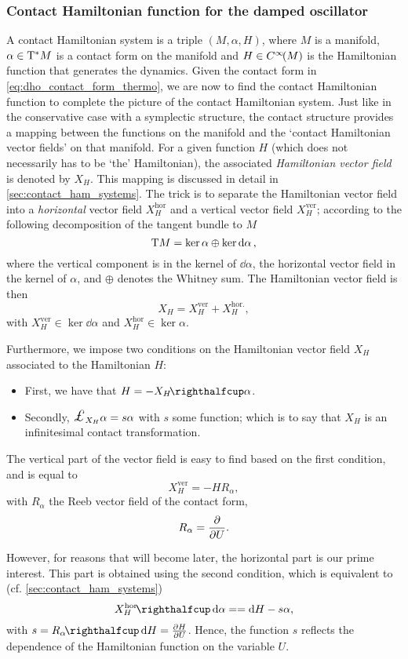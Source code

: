 \subsubsection{Contact Hamiltonian function for the damped oscillator}
A contact Hamiltonian system is a triple $(M, \alpha, H)$, where $M$ is a manifold, $\alpha \in \mathrm{T}^*M$ is a contact form on the manifold and $H \in C^\infty\!\qty(M)$ is the Hamiltonian function that generates the dynamics. Given the contact form in \cref{eq:dho_contact_form_thermo}, we are now to find the contact Hamiltonian function to complete the picture of the contact Hamiltonian system.  Just like in the conservative case with a symplectic structure, the contact structure provides a mapping between the functions on the manifold and the `contact Hamiltonian vector fields' on that manifold. For a given function $H$ (which does not necessarily has to be `the' Hamiltonian), the associated \emph{Hamiltonian vector field} is denoted by $X_H$. This mapping is discussed in detail in \cref{sec:contact_ham_systems}. The trick is to separate the Hamiltonian vector field into a \emph{horizontal} vector field $X^\text{hor}_H$  and a vertical vector field $X^\text{ver}_H$; according to the following decomposition of the tangent bundle to $M$ \cite{Libermann1987}
$$ \mathrm{T}M = \ker \alpha \oplus \ker \dd{\alpha},$$
where the vertical component is in the kernel of $ \dd{\alpha}$, the horizontal vector field in the kernel of $\alpha$, and $\oplus$ denotes the Whitney sum. The Hamiltonian vector field is then 
$$ X_H = X_H^\text{ver} + X_H^\text{hor.}, $$
with $X_H^\text{ver} \in \ker \dd{\alpha}$ and $X_H^\text{hor} \in \ker \alpha$.

Furthermore, we impose two conditions on the Hamiltonian vector field $X_H$ associated to the Hamiltonian $H$:
\begin{itemize}
    \item First, we have that $ H = -\intpr{X_H}{\alpha} $. 
    \item Secondly, $\lied{X_H}\alpha = s \alpha $ with $s$ some function; which is to say that $X_H$ is an infinitesimal contact transformation. 
\end{itemize}

The vertical part of the vector field is easy to find based on the first condition, and is equal to
$$ X_H^\text{ver} = - H R_\alpha, $$
with $R_\alpha$ the Reeb vector field of the contact form,
$$ R_\alpha = \pdv{}{U}.$$ 

However, for reasons that will become later, the horizontal part is our prime interest. This part is obtained using the second condition, which is equivalent to (cf. \cref{sec:contact_ham_systems})
\begin{equation}
    \intpr{X_H^\text{hor}}{\dd{\alpha}} =  = \dd{H} - s \alpha, 
    \label{eq:hor_vfield_condition}
\end{equation}
with $s = \intpr{R_\alpha}{\dd{H}} = \pdv{H}{U}$. Hence, the function $s$ reflects the dependence of the Hamiltonian function on the variable $U$.

